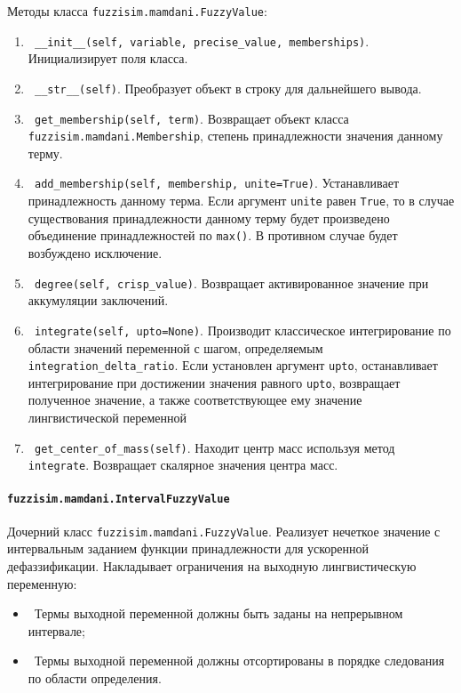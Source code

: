 Методы класса \lstinline!fuzzisim.mamdani.FuzzyValue!:
\begin{enumerate}[label=\arabic*)]
	\item \lstinline! __init__(self, variable, precise_value, memberships)!. Инициализирует поля класса.
	\item \lstinline! __str__(self)!.   Преобразует объект в строку для дальнейшего вывода.
	\item \lstinline! get_membership(self, term)!. Возвращает объект класса \lstinline!fuzzisim.mamdani.Membership!, степень принадлежности значения данному терму.
	\item \lstinline! add_membership(self, membership, unite=True)!. Устанавливает принадлежность данному терма. Если аргумент \lstinline!unite! равен \lstinline!True!, то в случае существования принадлежности данному терму будет произведено объединение принадлежностей по \lstinline!max()!. В противном случае будет возбуждено исключение.
	\item \lstinline! degree(self, crisp_value)!.  Возвращает активированное значение при аккумуляции заключений.
	\item \lstinline! integrate(self, upto=None)!. Производит классическое интегрирование по области значений переменной с шагом, определяемым \lstinline!integration_delta_ratio!. Если установлен аргумент \lstinline!upto!, останавливает интегрирование при достижении значения равного \lstinline!upto!, возвращает полученное значение, а также соответствующее ему значение лингвистической переменной
	\item \lstinline! get_center_of_mass(self)!. Находит центр масс используя метод \lstinline!integrate!. Возвращает скалярное значения центра масс.
\end{enumerate}




\paragraph{\lstinline!fuzzisim.mamdani.IntervalFuzzyValue!}

Дочерний класс \lstinline!fuzzisim.mamdani.FuzzyValue!. Реализует нечеткое значение с интервальным заданием функции принадлежности для ускоренной дефаззификации. Накладывает ограничения на выходную лингвистическую переменную:

\begin{itemize}
	\item \lstinline! !Термы выходной переменной должны быть заданы на непрерывном интервале;
	\item \lstinline! !Термы выходной переменной должны отсортированы в порядке следования по области определения.
\end{itemize}

